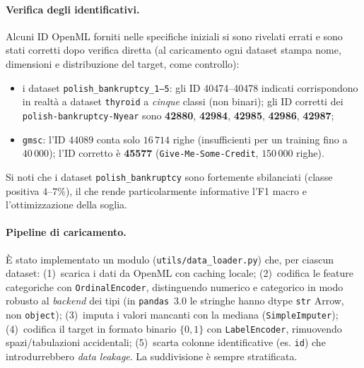 \documentclass[11pt,a4paper]{article}
\begin{document}
\paragraph{Verifica degli identificativi.} Alcuni ID OpenML forniti nelle
specifiche iniziali si sono rivelati errati e sono stati corretti dopo verifica
diretta (al caricamento ogni dataset stampa nome, dimensioni e distribuzione del
target, come controllo):
\begin{itemize}[nosep]
  \item i dataset \texttt{polish\_bankruptcy\_1--5}: gli ID 40474--40478 indicati
  corrispondono in realtà a dataset \texttt{thyroid} a \emph{cinque} classi (non
  binari); gli ID corretti dei \texttt{polish-bankruptcy-Nyear} sono
  \textbf{42880}, \textbf{42984}, \textbf{42985}, \textbf{42986}, \textbf{42987};
  \item \texttt{gmsc}: l'ID 44089 conta solo $16\,714$ righe (insufficienti per un
  training fino a $40\,000$); l'ID corretto è \textbf{45577}
  (\texttt{Give-Me-Some-Credit}, $150\,000$ righe).
\end{itemize}
Si noti che i dataset \texttt{polish\_bankruptcy} sono fortemente sbilanciati
(classe positiva $4$--$7\%$), il che rende particolarmente informative l'F1 macro
e l'ottimizzazione della soglia.

\paragraph{Pipeline di caricamento.} È stato implementato un modulo
(\texttt{utils/data\_loader.py}) che, per ciascun dataset: (1)~scarica i dati da
OpenML con caching locale; (2)~codifica le feature categoriche con
\texttt{OrdinalEncoder}, distinguendo numerico e categorico in modo robusto al
\emph{backend} dei tipi (in \texttt{pandas}~3.0 le stringhe hanno dtype
\texttt{str} Arrow, non \texttt{object}); (3)~imputa i valori mancanti con la
mediana (\texttt{SimpleImputer}); (4)~codifica il target in formato binario
$\{0,1\}$ con \texttt{LabelEncoder}, rimuovendo spazi/tabulazioni accidentali;
(5)~scarta colonne identificative (es. \texttt{id}) che introdurrebbero
\emph{data leakage}. La suddivisione è sempre stratificata.
\end{document}
